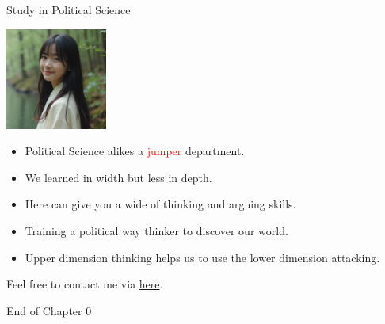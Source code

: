 \documentclass{beamer}
\begin{document}
\begin{frame}{Study in Political Science}
\begin{center}
\includegraphics[width=0.25\textwidth]{motivate.png}
\end{center}
\begin{itemize}
\item Political Science alikes a \textcolor{red}{jumper} department.
\item We learned in width but less in depth.
\item Here can give you a wide of thinking and arguing skills.
\item Training a political way thinker to discover our world.
\item Upper dimension thinking helps us to use the lower dimension attacking.
\end{itemize}
\end{frame}
\begin{frame}{}
\begin{center}
\Large{Feel free to contact me via \href{mailto:politics.tchsiao@gmail.com}{here}.}
\end{center}
\end{frame}
\begin{frame}{}
\begin{center}
\Large{End of Chapter 0}
\end{center}
\end{frame}
\end{document}
